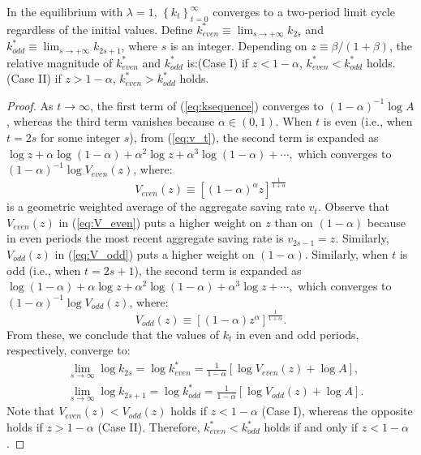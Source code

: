\documentclass[nogrid]{MBE}%
\begin{document}
{\begin{flLem}
In the equilibrium with $\lambda=1$, $\left\{ k_{t}\right\} _{t=0}^{\infty}$ converges to a
two-period limit cycle regardless of the initial values. Define $k_{even}^{\ast}\equiv\lim
_{s\rightarrow+\infty}k_{2s}$ and $k_{odd}^{\ast}\equiv\lim_{s\rightarrow +\infty}k_{2s+1}$, where
$s$ is an integer. Depending on $z\equiv \beta/(1+\beta)$, the relative magnitude of
$k_{even}^{\ast}$ and
$k_{odd}^{\ast}$ is:\newline\textrm{(Case I)} if $z<1-\alpha$, $k_{even}%
^{\ast}<k_{odd}^{\ast}$ holds.\newline\textrm{(Case II)} if $z>1-\alpha$,
$k_{even}^{\ast}>k_{odd}^{\ast}$ holds. {\label{fn:caseII}}
\end{flLem}

\begin{proof}
As $t\rightarrow\infty$, the first term of (\ref{eq:ksequence}) converges to
$(1-\alpha)^{-1}\log A$, whereas the third term vanishes because $\alpha
\in(0,1)$. When $t$ is even (i.e., when $t=2s$ for some integer $s$), from
(\ref{eq:v_t}), the second term is expanded as $\log z+\alpha\log
(1-\alpha)+\alpha^{2}\log z+\alpha^{3}\log(1-\alpha)+\cdots,$ which converges
to $(1-\alpha)^{-1}\log V_{even}(z)$, where:
\begin{equation}
V_{even}(z)\equiv\left[  \left(  1-\alpha\right)  ^{\alpha}z\right]
^{\frac{1}{1+\alpha}} \label{eq:V_even}%
\end{equation}
is a geometric weighted average of the aggregate saving rate $v_{t}%
$. {Observe that $V_{even}(z)$ in (\ref{eq:V_even}) puts a higher weight on $z$ than on
$(1-\alpha)$ because in even periods the most recent aggregate saving rate is $v_{2s-1}=z$.
Similarly, $V_{odd}(z)$ in (\ref{eq:V_odd}) puts a higher weight on $(1-\alpha)$.} Similarly, when
$t$ is odd (i.e., when $t=2s+1$), the second term is expanded as $\log(1-\alpha )+\alpha\log
z+\alpha^{2}\log(1-\alpha)+\alpha^{3}\log z+\cdots,$ which converges to $(1-\alpha)^{-1}\log
V_{odd}(z)$, where:
\begin{equation}
V_{odd}(z)\equiv\left[  \left(  1-\alpha\right)  z^{\alpha}\right]  ^{\frac
{1}{1+\alpha}}. \label{eq:V_odd}%
\end{equation}
From these, we conclude that the values of $k_{t}$ in even and odd periods,
respectively, converge to:
\begin{align}
&  \lim_{s\rightarrow\infty}\log k_{2s}=\log k_{even}^{\ast}=\frac{1}%
{1-\alpha}\left[  \log V_{even}(z)+\log A\right]  ,\label{eq:Logk*_Even}\\
&  \lim_{s\rightarrow\infty}\log k_{2s+1}=\log k_{odd}^{\ast}=\frac
{1}{1-\alpha}\left[  \log V_{odd}(z)+\log A\right]  . \label{eq:Logk*_Odd}%
\end{align}
Note that $V_{even}(z)<V_{odd}(z)$ holds if $z<1-\alpha$ (Case I), whereas the
opposite holds if $z>1-\alpha$ (Case II). Therefore, $k_{even}^{\ast}%
<k_{odd}^{\ast}$ holds if and only if $z<1-\alpha$.
\end{proof}

}
\end{document}
